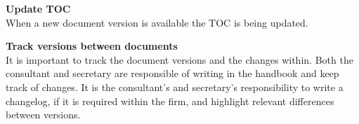 \textbf{Update TOC}
\\
When a new document version is available the TOC is being updated.

\textbf{Track versions between documents}
\\
It is important to track the document versions and the changes within.
Both the consultant and secretary are responsible of writing in the handbook and keep track of changes.
It is the consultant's and secretary’s responsibility to write a changelog, if it is required within the firm, and highlight relevant differences between versions.

